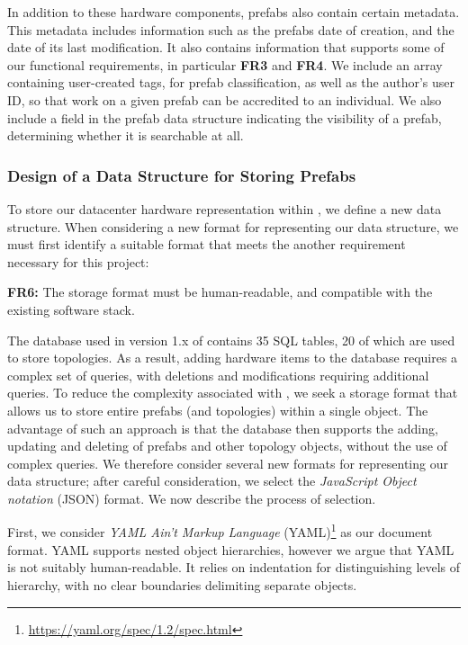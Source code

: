 \documentclass[11pt]{article}
\begin{document}
			In addition to these hardware components, prefabs also contain certain metadata.
			This metadata includes information such as the prefabs date of creation, and the date of its last modification.
			It also contains information that supports some of our functional requirements, in particular \textbf{FR3} and \textbf{FR4}.
			We include an array containing user-created tags, for prefab classification, as well as the author's user ID, so that work on a given prefab can be accredited to an individual.
			We also include a field in the prefab data structure indicating the visibility of a prefab, determining whether it is searchable at all.

		\subsubsection{Design of a Data Structure for Storing Prefabs}


		To store our datacenter hardware representation within \opendc{}, we define a new data structure.
		When considering a new format for representing our data structure, we must first identify a suitable format that meets the another requirement necessary for this project:

		\textbf{FR6:} The storage format must be human-readable, and compatible with the existing \opendc{} software stack.

		The database used in version 1.x of \opendc{} contains 35 SQL tables, 20 of which are used to store topologies.
		As a result, adding hardware items to the database requires a complex set of queries, with deletions and modifications requiring additional queries.
		To reduce the complexity associated with \opendc{}, we seek a storage format that allows us to store entire prefabs (and topologies) within a single object.
		The advantage of such an approach is that the database then supports the adding, updating and deleting of prefabs and other topology objects, without the use of complex queries.
		We therefore consider several new formats for representing our data structure; after careful consideration, we select the \textit{JavaScript Object notation} (JSON) format. We now describe the process of selection.

		First, we consider \textit{YAML Ain't Markup Language} (YAML)\footnote{\url{https://yaml.org/spec/1.2/spec.html}} as our document format.
		YAML supports nested object hierarchies, however we argue that YAML is not suitably human-readable.
		It relies on indentation for distinguishing levels of hierarchy, with no clear boundaries delimiting separate objects.
\end{document}
